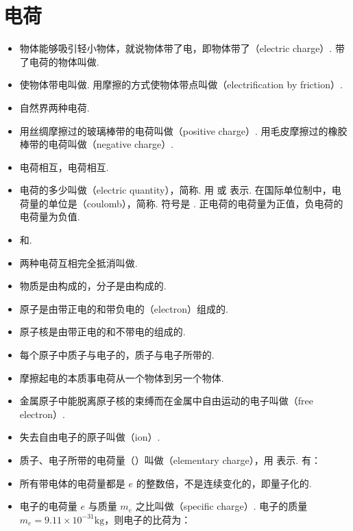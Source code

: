 \newpage
\section{电荷}

\vspace{10pt}
\begin{itemize}
\item 物体能够吸引轻小物体，就说物体带了电，即物体带了（electric charge）. 带了电荷的物体叫做.
\item 使物体带电叫做. 用摩擦的方式使物体带点叫做（electrification by friction）.
\item 自然界两种电荷.
\item 用丝绸摩擦过的玻璃棒带的电荷叫做（positive charge）. 用毛皮摩擦过的橡胶棒带的电荷叫做（negative charge）.
\item {}电荷相互，电荷相互.
\item 电荷的多少叫做（electric quantity），简称. 用  或  表示. 在国际单位制中，电荷量的单位是（coulomb），简称. 符号是 . 正电荷的电荷量为正值，负电荷的电荷量为负值.
\item {}和.
\item 两种电荷互相完全抵消叫做.
\item 物质是由构成的，分子是由构成的.
\item 原子是由带正电的和带负电的（electron）组成的.
\item 原子核是由带正电的和不带电的组成的.
\item 每个原子中质子与电子的，质子与电子所带的.
\item 摩擦起电的本质事电荷从一个物体到另一个物体.
\item 金属原子中能脱离原子核的束缚而在金属中自由运动的电子叫做（free electron）.
\item 失去自由电子的原子叫做（ion）.
\item 质子、电子所带的电荷量（）叫做（elementary charge），用  表示. 有：
\item 所有带电体的电荷量都是 $e$ 的整数倍，不是连续变化的，即量子化的.
\item 电子的电荷量 $e$ 与质量 $m_e$ 之比叫做（specific charge）. 电子的质量 $m_e=9.11\times10^{-31}\text{kg}$，则电子的比荷为：

\end{itemize}
